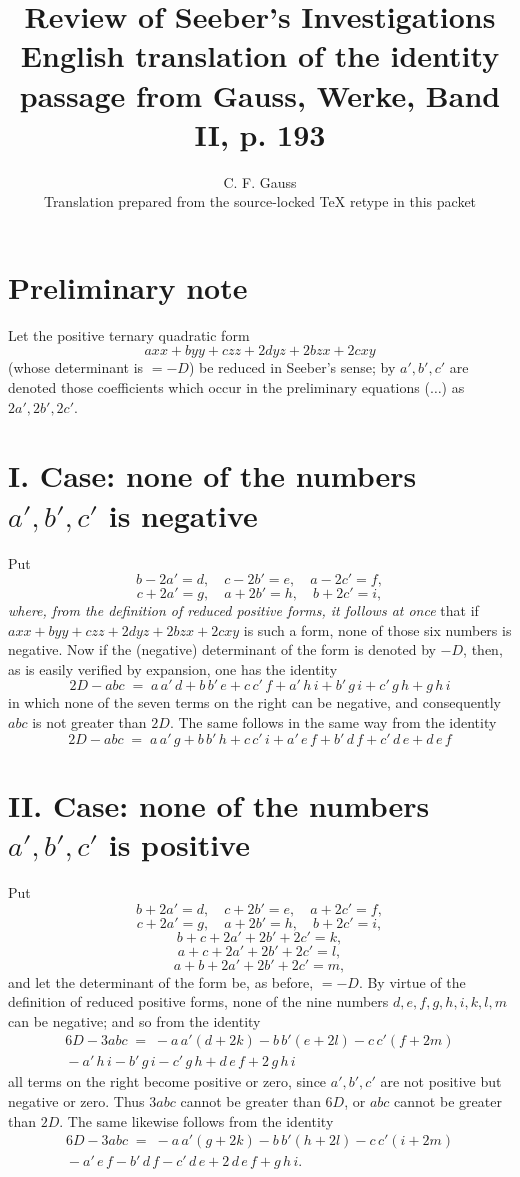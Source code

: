 \documentclass[11pt]{article}
\title{Review of Seeber's Investigations\\[2pt]
\large English translation of the identity passage from Gauss, Werke, Band II, p. 193}
\author{C. F. Gauss\\[2pt]\normalsize Translation prepared from the source-locked TeX retype in this packet}
\date{}
\begin{document}
\maketitle

\section*{Preliminary note}

Let the positive ternary quadratic form
\[
  axx+byy+czz+2dyz+2bzx+2cxy
\]
(whose determinant is $=-D$) be reduced in Seeber's sense; by $a',b',c'$ are
denoted those coefficients which occur in the preliminary equations ($\dots$) as
$2a', 2b', 2c'$.

\section*{I. Case: none of the numbers $a',b',c'$ is negative}

Put
\[
  b-2a'=d,\quad c-2b'=e,\quad a-2c'=f,
\]
\[
  c+2a'=g,\quad a+2b'=h,\quad b+2c'=i,
\]
\emph{where, from the definition of reduced positive forms, it follows at once}
that if $axx+byy+czz+2dyz+2bzx+2cxy$ is such a form, none of those six
numbers is negative. Now if the (negative) determinant of the form is denoted by
$-D$, then, as is easily verified by expansion, one has the identity
\[
\boxed{\;2D-abc \;=\; a\,a'\,d+b\,b'\,e+c\,c'\,f+a'\,h\,i+b'\,g\,i+c'\,g\,h+g\,h\,i\;}
\]
in which none of the seven terms on the right can be negative, and consequently
$abc$ is not greater than $2D$. The same follows in the same way from the
identity
\[
\boxed{\;2D-abc \;=\; a\,a'\,g+b\,b'\,h+c\,c'\,i+a'\,e\,f+b'\,d\,f+c'\,d\,e+d\,e\,f\;}
\]

\section*{II. Case: none of the numbers $a',b',c'$ is positive}

Put
\[
  b+2a'=d,\quad c+2b'=e,\quad a+2c'=f,
\]
\[
  c+2a'=g,\quad a+2b'=h,\quad b+2c'=i,
\]
\[
  b+c+2a'+2b'+2c'=k,
\]
\[
  a+c+2a'+2b'+2c'=l,
\]
\[
  a+b+2a'+2b'+2c'=m,
\]
and let the determinant of the form be, as before, $=-D$. By virtue of the
definition of reduced positive forms, none of the nine numbers
$d,e,f,g,h,i,k,l,m$ can be negative; and so from the identity
\begin{multline*}
6D-3abc \;=\; -a\,a'(d+2k)-b\,b'(e+2l)-c\,c'(f+2m)\\
{}-a'\,h\,i-b'\,g\,i-c'\,g\,h+d\,e\,f+2\,g\,h\,i
\end{multline*}
all terms on the right become positive or zero, since $a',b',c'$ are not
positive but negative or zero. Thus $3abc$ cannot be greater than $6D$, or
$abc$ cannot be greater than $2D$. The same likewise follows from the identity
\begin{multline*}
6D-3abc \;=\; -a\,a'(g+2k)-b\,b'(h+2l)-c\,c'(i+2m)\\
{}-a'\,e\,f-b'\,d\,f-c'\,d\,e+2\,d\,e\,f+g\,h\,i.
\end{multline*}
\end{document}
